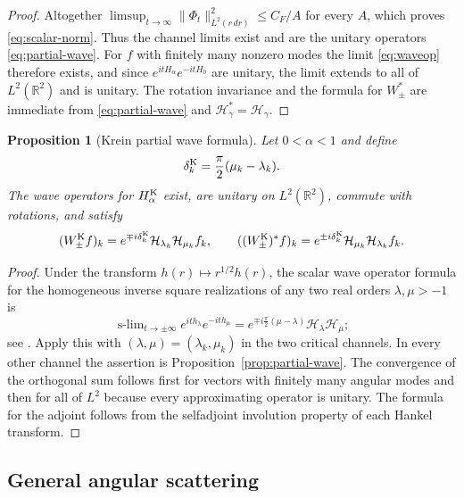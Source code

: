 \documentclass[11pt,a4paper,reqno,backref=page]{amsart}
\newcommand{\R}{\mathbb R}
\newcommand{\HH}{\mathcal H}                 %
\DeclareMathOperator*{\slim}{s\text{-}lim}
\numberwithin{equation}{section}
\newtheorem{proposition}[theorem]{Proposition}
\theoremstyle{definition}
\theoremstyle{remark}
\begin{document}
\begin{proof}
Altogether $\limsup_{t\to\infty}\|\Phi_t\|^2_{L^2(r\,dr)}\le
C_F/A$ for every $A$, which proves \eqref{eq:scalar-norm}. Thus
the channel limits exist and are the unitary operators
\eqref{eq:partial-wave}. For $f$ with finitely many nonzero
modes the limit \eqref{eq:waveop} therefore exists, and since
$e^{itH_\alpha}e^{-itH_0}$ are unitary, the limit extends to all
of $L^2(\R^2)$ and is unitary. The rotation invariance and the
formula for $W_\pm^*$ are immediate from \eqref{eq:partial-wave}
and $\HH_\gamma^*=\HH_\gamma$.
\end{proof}

\begin{proposition}[Krein partial wave formula]
\label{prop:Krein-partial-wave}
Let $0<\alpha<1$ and define
\begin{equation*}
  \delta_k^{\rm K}=\frac\pi2(\mu_k-\lambda_k).
\end{equation*}
The wave operators for $H_\alpha^{\rm K}$ exist, are unitary on
$L^2(\R^2)$, commute with rotations, and satisfy
\begin{equation}\label{eq:Krein-partial-wave}
  (W_\pm^{\rm K}f)_k
  =e^{\mp i\delta_k^{\rm K}}\HH_{\lambda_k}\HH_{\mu_k}f_k,
  \qquad
  ((W_\pm^{\rm K})^*f)_k
  =e^{\pm i\delta_k^{\rm K}}\HH_{\mu_k}\HH_{\lambda_k}f_k.
\end{equation}
\end{proposition}

\begin{proof}
Under the transform $h(r)\mapsto r^{1/2}h(r)$, the
scalar wave operator formula for the homogeneous inverse square
realizations of any two real orders $\lambda,\mu>-1$ is
\begin{equation*}
  \slim_{t\to\pm\infty}e^{ith_\lambda}e^{-ith_\mu}
  =e^{\mp i\frac\pi2(\mu-\lambda)}\HH_\lambda\HH_\mu;
\end{equation*}
see \cite[Theorem~4.10 and Eqs.~(4.22)--(4.24)]
{DerezinskiRichard2017}.
Apply this with $(\lambda,\mu)=(\lambda_k,\mu_k)$ in the two
critical channels.
In every other channel the assertion is
Proposition~\ref{prop:partial-wave}. The convergence of the
orthogonal sum follows first for vectors with finitely many
angular modes and then for all of $L^2$ because every
approximating operator is unitary. The formula for the adjoint
follows from the selfadjoint involution property of each Hankel
transform.
\end{proof}

\subsection{General angular scattering}
\end{document}
